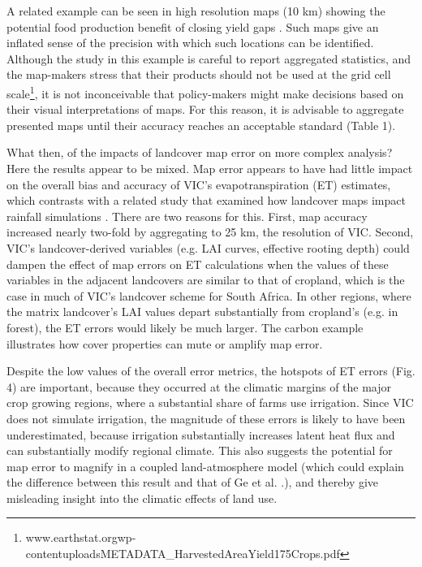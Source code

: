 \documentclass{pnastwo}
\begin{document}
\begin{article}
A related example can be seen in high resolution maps (10 km) showing the potential food production benefit of closing yield gaps \cite[e.g. Figure 3 in][]{foley_solutions_2011}. Such maps give an inflated sense of the precision with which such locations can be identified. Although the study in this example is careful to report aggregated statistics, and the map-makers stress that their products should not be used at the grid cell scale\footnote{www.earthstat.org\/wp-content\/uploads\/METADATA\_HarvestedAreaYield175Crops.pdf}, it is not inconceivable that policy-makers might make decisions based on their visual interpretations of maps. For this reason, it is advisable to aggregate presented maps until their accuracy reaches an acceptable standard (Table 1). 

What then, of the impacts of landcover map error on more complex analysis?  Here the results appear to be mixed. Map error appears to have had little impact on the overall bias and accuracy of VIC's evapotranspiration (ET) estimates, which contrasts with a related study that examined how landcover maps impact rainfall simulations \cite{ge_impacts_2007}. There are two reasons for this. First, map accuracy increased nearly two-fold by aggregating to 25 km, the resolution of VIC. Second, VIC's landcover-derived variables (e.g. LAI curves, effective rooting depth) could dampen the effect of map errors on ET calculations when the values of these variables in the adjacent landcovers are similar to that of cropland, which is the case in much of VIC's landcover scheme for South Africa. In other regions, where the matrix landcover's LAI values depart substantially from cropland's (e.g. in forest), the ET errors would likely be much larger. The carbon example illustrates how cover properties can mute or amplify map error.  

Despite the low values of the overall error metrics, the hotspots of ET errors (Fig. 4) are important, because they occurred at the climatic margins of the major crop growing regions, where a substantial share of farms use irrigation. Since VIC does not simulate irrigation, the magnitude of these errors is likely to have been underestimated, because irrigation substantially increases latent heat flux and can substantially modify regional climate\cite{sacks_effects_2008,mueller_cooling_2015}. This also suggests the potential for map error to magnify in a coupled land-atmosphere model (which could explain the difference between this result and that of Ge et al. \cite{ge_impacts_2007}.), and thereby give misleading insight into the climatic effects of land use.     


\end{article}
\end{document}
